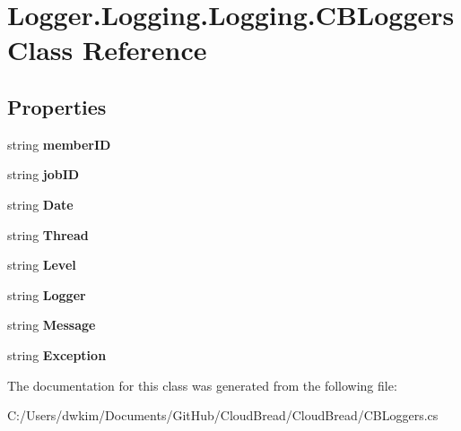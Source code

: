 \hypertarget{a00043}{}\section{Logger.\+Logging.\+Logging.\+C\+B\+Loggers Class Reference}
\label{a00043}
\subsection*{Properties}
\begin{DoxyCompactItemize}
\item 
string {\bfseries member\+ID}\hypertarget{a00043_a3abe5c2aee36107226463da1622d89b9}{}\label{a00043_a3abe5c2aee36107226463da1622d89b9}

\item 
string {\bfseries job\+ID}\hypertarget{a00043_aa9894664e5915a8c941d83723d542c5c}{}\label{a00043_aa9894664e5915a8c941d83723d542c5c}

\item 
string {\bfseries Date}\hypertarget{a00043_a0b8a58a2a7107e2e62bf5d4df95f2ca5}{}\label{a00043_a0b8a58a2a7107e2e62bf5d4df95f2ca5}

\item 
string {\bfseries Thread}\hypertarget{a00043_ab176fb7f2eacd7624432658c71332427}{}\label{a00043_ab176fb7f2eacd7624432658c71332427}

\item 
string {\bfseries Level}\hypertarget{a00043_ab848a361f1ed8c72a47dde534ef1efbd}{}\label{a00043_ab848a361f1ed8c72a47dde534ef1efbd}

\item 
string {\bfseries Logger}\hypertarget{a00043_a3ecf08bc40529225da9595b08b380b88}{}\label{a00043_a3ecf08bc40529225da9595b08b380b88}

\item 
string {\bfseries Message}\hypertarget{a00043_a04615dd7cf88063853227fa1cd96b0d1}{}\label{a00043_a04615dd7cf88063853227fa1cd96b0d1}

\item 
string {\bfseries Exception}\hypertarget{a00043_a33addd1cc6e0f3c00151e64a711aad2d}{}\label{a00043_a33addd1cc6e0f3c00151e64a711aad2d}

\end{DoxyCompactItemize}


The documentation for this class was generated from the following file\+:\begin{DoxyCompactItemize}
\item 
C\+:/\+Users/dwkim/\+Documents/\+Git\+Hub/\+Cloud\+Bread/\+Cloud\+Bread/C\+B\+Loggers.\+cs\end{DoxyCompactItemize}
